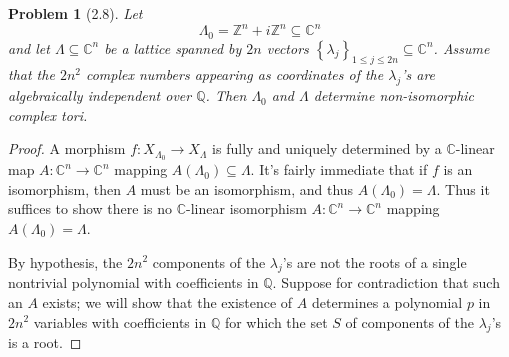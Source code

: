 \documentclass[11pt, letterpaper]{article}
\theoremstyle{plain}
\newtheorem{problem}{Problem}
\begin{document}
\begin{problem}[2.8]
	Let
	\[
		\Lambda _0 = \mathbb{Z} ^n + i\mathbb{Z} ^n \subseteq \mathbb{C} ^n
	\]
	and let $\Lambda \subseteq \mathbb{C} ^n$ be a lattice spanned by $2n$ vectors $\left\{ \lambda _j \right\} _{1\leq j\leq 2n} \subseteq \mathbb{C} ^n$. Assume that the $2n^2$ complex numbers appearing as coordinates of the $\lambda _j$'s are algebraically independent over $\mathbb{Q} $. Then $\Lambda _0$ and $\Lambda $ determine non-isomorphic complex tori.
\end{problem}
\begin{proof}
	A morphism $f : X_{\Lambda _0}  \to X_\Lambda $ is fully and uniquely determined by a $\mathbb{C} $-linear map $A : \mathbb{C} ^n \to \mathbb{C} ^n$ mapping $A(\Lambda _0)\subseteq \Lambda $. It's fairly immediate that if $f$ is an isomorphism, then $A$ must be an isomorphism, and thus $A(\Lambda _0)=\Lambda $. Thus it suffices to show there is no $\mathbb{C} $-linear isomorphism $A : \mathbb{C} ^n \to \mathbb{C} ^n$ mapping $A(\Lambda_0)=\Lambda$.

	By hypothesis, the $2n^2$ components of the $\lambda _j$'s are not the roots of a single nontrivial polynomial with coefficients in $\mathbb{Q} $. Suppose for contradiction that such an $A$ exists; we will show that the existence of $A$ determines a polynomial $p$ in $2n^2$ variables with coefficients in $\mathbb{Q} $ for which the set $S$ of components of the $\lambda _j$'s is a root.
	

\end{proof}
\end{document}
